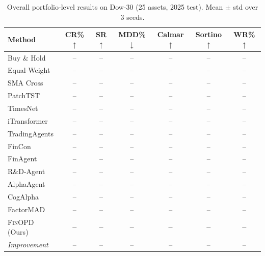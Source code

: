 \begin{table}[t]
\renewcommand{\arraystretch}{0.95}
\footnotesize
\caption{Overall portfolio-level results on Dow-30 (25 assets, 2025 test). Mean $\pm$ std over 3 seeds.}
\setlength{\abovecaptionskip}{0.1cm}
\centering
\setlength{\tabcolsep}{3pt}
\begin{tabular}{lcccccc}
\toprule
Method & CR\%$\uparrow$ & SR$\uparrow$ & MDD\%$\downarrow$ & Calmar$\uparrow$ & Sortino$\uparrow$ & WR\%$\uparrow$ \\
\midrule
Buy \& Hold & -- & -- & -- & -- & -- & -- \\
Equal-Weight & -- & -- & -- & -- & -- & -- \\
SMA Cross & -- & -- & -- & -- & -- & -- \\
\midrule
PatchTST & -- & -- & -- & -- & -- & -- \\
TimesNet & -- & -- & -- & -- & -- & -- \\
iTransformer & -- & -- & -- & -- & -- & -- \\
\midrule
TradingAgents & -- & -- & -- & -- & -- & -- \\
FinCon & -- & -- & -- & -- & -- & -- \\
FinAgent & -- & -- & -- & -- & -- & -- \\
R\&D-Agent & -- & -- & -- & -- & -- & -- \\
AlphaAgent & -- & -- & -- & -- & -- & -- \\
\midrule
CogAlpha & -- & -- & -- & -- & -- & -- \\
FactorMAD & -- & -- & -- & -- & -- & -- \\
\midrule
\textsc{FinOPD} (Ours) & \textbf{--} & \textbf{--} & \textbf{--} & \textbf{--} & \textbf{--} & \textbf{--} \\
\midrule
\textit{Improvement} & -- & -- & -- & -- & -- & -- \\
\bottomrule
\end{tabular}
\label{tab:overall}
\end{table}
